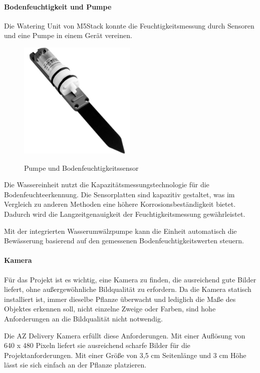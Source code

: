 \paragraph{Bodenfeuchtigkeit und Pumpe}
Die Watering Unit von M5Stack konnte die Feuchtigkeitsmessung durch Sensoren und eine Pumpe in einem Gerät vereinen. \cite{m5stack-watering-unit}

\begin{figure}[H]
\centering
\includegraphics[width=0.5\textwidth]{images/Pumpe.jpg}
\caption{Pumpe und Bodenfeuchtigkeitssensor}\cite{rainpoint_smart_timer}
\label{fig:rainpointDiagram}
\end{figure}

Die Wassereinheit nutzt die Kapazitätsmessungstechnologie für die Bodenfeuchteerkennung. Die Sensorplatten sind kapazitiv gestaltet, was im Vergleich zu anderen Methoden eine höhere Korrosionsbeständigkeit bietet. Dadurch wird die Langzeitgenauigkeit der Feuchtigkeitsmessung gewährleistet.

Mit der integrierten Wasserumwälzpumpe kann die Einheit automatisch die Bewässerung basierend auf den gemessenen Bodenfeuchtigkeitswerten steuern. 

\paragraph{Kamera}
Für das Projekt ist es wichtig, eine Kamera zu finden, die ausreichend gute Bilder liefert, ohne außergewöhnliche Bildqualität zu erfordern. Da die Kamera statisch installiert ist, immer dieselbe Pflanze überwacht und lediglich die Maße des Objektes erkennen soll, nicht einzelne Zweige oder Farben, sind hohe Anforderungen an die Bildqualität nicht notwendig.

Die AZ Delivery Kamera erfüllt diese Anforderungen.\cite{azdelivery2024camera} Mit einer Auflösung von 640 x 480 Pixeln liefert sie ausreichend scharfe Bilder für die Projektanforderungen. Mit einer Größe von 3,5 cm Seitenlänge und 3 cm Höhe lässt sie sich einfach an der Pflanze platzieren.

